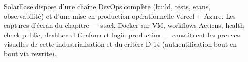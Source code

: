 \begin{conclusionbox}
SolarEase dispose d'une chaîne DevOps complète (build, tests, scans,
observabilité) et d'une mise en production opérationnelle Vercel + Azure.
Les captures d'écran du chapitre --- stack Docker sur VM, workflows Actions,
health check public, dashboard Grafana et login production --- constituent
les preuves visuelles de cette industrialisation et du critère D-14
(authentification bout en bout via rewrite).
\end{conclusionbox}
